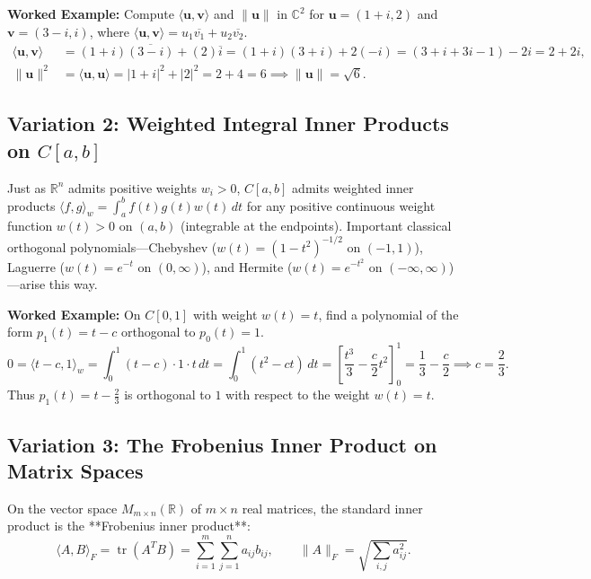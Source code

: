 \documentclass[11pt, letterpaper]{article}
\theoremstyle{definition}
\theoremstyle{remark}
\begin{document}
\textbf{Worked Example:} Compute $\langle \mathbf{u}, \mathbf{v} \rangle$ and $\|\mathbf{u}\|$ in $\mathbb{C}^2$ for $\mathbf{u} = (1 + i, 2)$ and $\mathbf{v} = (3 - i, i)$, where $\langle \mathbf{u}, \mathbf{v} \rangle = u_1 \overline{v_1} + u_2 \overline{v_2}$.
\begin{align*}
    \langle \mathbf{u}, \mathbf{v} \rangle &= (1 + i)\overline{(3 - i)} + (2)\overline{i} = (1 + i)(3 + i) + 2(-i) = (3 + i + 3i - 1) - 2i = 2 + 2i, \\
    \|\mathbf{u}\|^2 &= \langle \mathbf{u}, \mathbf{u} \rangle = |1 + i|^2 + |2|^2 = 2 + 4 = 6 \implies \|\mathbf{u}\| = \sqrt{6}.
\end{align*}

\subsection{Variation 2: Weighted Integral Inner Products on $C[a, b]$}
Just as $\mathbb{R}^n$ admits positive weights $w_i > 0$, $C[a, b]$ admits weighted inner products $\langle f, g \rangle_w = \int_a^b f(t)g(t)w(t)\,dt$ for any positive continuous weight function $w(t) > 0$ on $(a, b)$ (integrable at the endpoints). Important classical orthogonal polynomials—Chebyshev ($w(t) = (1-t^2)^{-1/2}$ on $(-1, 1)$), Laguerre ($w(t) = e^{-t}$ on $(0, \infty)$), and Hermite ($w(t) = e^{-t^2}$ on $(-\infty, \infty)$)—arise this way.

\textbf{Worked Example:} On $C[0, 1]$ with weight $w(t) = t$, find a polynomial of the form $p_1(t) = t - c$ orthogonal to $p_0(t) = 1$.
\[
    0 = \langle t - c, 1 \rangle_w = \int_0^1 (t - c) \cdot 1 \cdot t\,dt = \int_0^1 (t^2 - ct)\,dt = \left[\frac{t^3}{3} - \frac{c}{2}t^2\right]_0^1 = \frac{1}{3} - \frac{c}{2} \implies c = \frac{2}{3}.
\]
Thus $p_1(t) = t - \frac{2}{3}$ is orthogonal to $1$ with respect to the weight $w(t) = t$.

\subsection{Variation 3: The Frobenius Inner Product on Matrix Spaces}
On the vector space $M_{m \times n}(\mathbb{R})$ of $m \times n$ real matrices, the standard inner product is the **Frobenius inner product**:
\[
    \langle A, B \rangle_F = \operatorname{tr}(A^T B) = \sum_{i=1}^m \sum_{j=1}^n a_{ij} b_{ij}, \qquad \|A\|_F = \sqrt{\sum_{i,j} a_{ij}^2}.
\]
\end{document}
